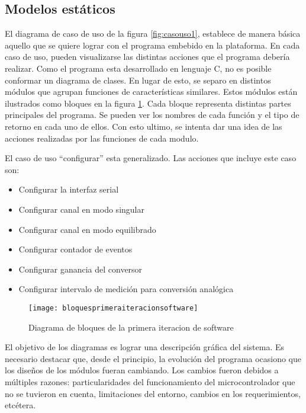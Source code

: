\subsection{Modelos estáticos} %
\label{it2:sub:modelos_estaticos}

El diagrama de caso de uso de la figura \ref{fig:casouso1}, establece de manera básica aquello que se quiere lograr con el programa embebido en la plataforma. En cada caso de uso, pueden visualizarse las distintas acciones que el programa debería realizar. Como el programa esta desarrollado en lenguaje C, no es posible conformar un diagrama de clases. En lugar de esto, se separo en distintos módulos que agrupan funciones de características similares. Estos módulos están ilustrados como bloques en la figura \ref{it2:fig:bloquesprimeraiteracionsoftware}. Cada bloque representa distintas partes principales del programa. Se pueden ver los nombres de cada función y el tipo de retorno en cada uno de ellos. Con esto ultimo, se intenta dar una idea de las acciones realizadas por las funciones de cada modulo. %

El caso de uso ``configurar'' esta generalizado. Las acciones que incluye este caso son:
\begin{itemize}
  \item Configurar la interfaz serial
  \item Configurar canal en modo singular
  \item Configurar canal en modo equilibrado
  \item Configurar contador de eventos
  \item Configurar ganancia del conversor
  \item Configurar intervalo de medición para conversión analógica
\end{itemize}


\begin{figure}[h]
  \centering
  \texttt{[image: bloquesprimeraiteracionsoftware]}
  \caption{Diagrama de bloques de la primera iteracion de software}\label{it2:fig:bloquesprimeraiteracionsoftware}
\end{figure}

El objetivo de los diagramas es lograr una descripción gráfica del sistema. Es necesario destacar que, desde el principio, la evolución del programa ocasiono que los diseños de los módulos fueran cambiando. Los cambios fueron debidos a múltiples razones: particularidades del funcionamiento del microcontrolador que no se tuvieron en cuenta, limitaciones del entorno, cambios en los requerimientos, etcétera. 

